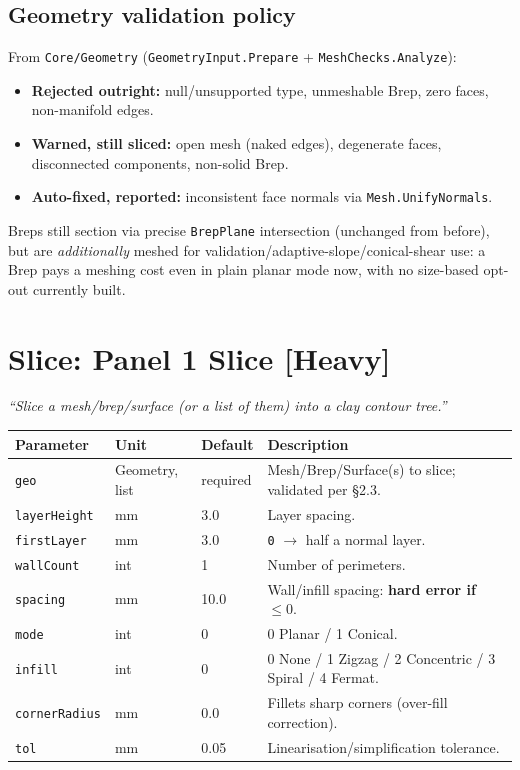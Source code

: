 \documentclass[11pt]{article}
\newcommand{\param}[1]{\texttt{#1}}
\newcommand{\heavy}{\textbf{[Heavy]}}
\begin{document}
\subsection{Geometry validation policy}

From \param{Core/Geometry} (\param{GeometryInput.Prepare} +
\param{MeshChecks.Analyze}):

\begin{itemize}
  \item \textbf{Rejected outright:} null/unsupported type, unmeshable Brep, zero faces, non-manifold edges.
  \item \textbf{Warned, still sliced:} open mesh (naked edges), degenerate faces, disconnected components, non-solid Brep.
  \item \textbf{Auto-fixed, reported:} inconsistent face normals via \param{Mesh.UnifyNormals}.
\end{itemize}

Breps still section via precise \param{BrepPlane} intersection
(unchanged from before), but are \emph{additionally} meshed for
validation/adaptive-slope/conical-shear use: a Brep pays a
meshing cost even in plain planar mode now, with no size-based opt-out
currently built.

\section{Slice: Panel 1 Slice \heavy{}}

\emph{``Slice a mesh/brep/surface (or a list of them) into a clay contour tree.''}

\begin{longtable}{@{}p{3.0cm}p{2.0cm}p{1.6cm}p{7.0cm}@{}}
\toprule
\textbf{Parameter} & \textbf{Unit} & \textbf{Default} & \textbf{Description} \\
\midrule
\endhead
\param{geo} & Geometry, list & required & Mesh/Brep/Surface(s) to slice; validated per \S 2.3. \\
\param{layerHeight} & mm & 3.0 & Layer spacing. \\
\param{firstLayer} & mm & 3.0 & \param{0} $\rightarrow$ half a normal layer. \\
\param{wallCount} & int & 1 & Number of perimeters. \\
\param{spacing} & mm & 10.0 & Wall/infill spacing: \textbf{hard error if $\leq 0$}. \\
\param{mode} & int & 0 & 0 Planar / 1 Conical. \\
\param{infill} & int & 0 & 0 None / 1 Zigzag / 2 Concentric / 3 Spiral / 4 Fermat. \\
\param{cornerRadius} & mm & 0.0 & Fillets sharp corners (over-fill correction). \\
\param{tol} & mm & 0.05 & Linearisation/simplification tolerance. \\
\bottomrule
\end{longtable}
\end{document}
